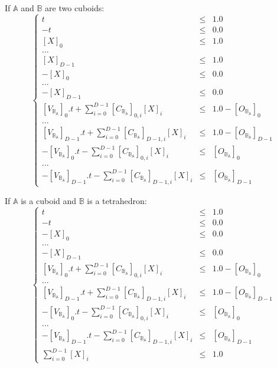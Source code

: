 \documentclass[12pt, a4paper]{article}
\begin{document}
If $\mathbb{A}$ and $\mathbb{B}$ are two cuboids:
\begin{equation}
\left\lbrace
\begin{array}{rcl}
t&\le&1.0\\
-t&\le&0.0\\
\left[X\right]_0&\le&1.0\\
...\\
\left[X\right]_{D-1}&\le&1.0\\
-\left[X\right]_0&\le&0.0\\
...\\
-\left[X\right]_{D-1}&\le&0.0\\
\left[V_{\mathbb{B}_\mathbb{A}}\right]_0.t+\sum_{i=0}^{D-1}\left[C_{\mathbb{B}_\mathbb{A}}\right]_{0,i}\left[X\right]_i&\le&1.0-\left[O_{\mathbb{B}_\mathbb{A}}\right]_0\\
...\\
\left[V_{\mathbb{B}_\mathbb{A}}\right]_{D-1}.t+\sum_{i=0}^{D-1}\left[C_{\mathbb{B}_\mathbb{A}}\right]_{D-1,i}\left[X\right]_i&\le&1.0-\left[O_{\mathbb{B}_\mathbb{A}}\right]_{D-1}\\
-\left[V_{\mathbb{B}_\mathbb{A}}\right]_0.t-\sum_{i=0}^{D-1}\left[C_{\mathbb{B}_\mathbb{A}}\right]_{0,i}\left[X\right]_i&\le&\left[O_{\mathbb{B}_\mathbb{A}}\right]_0\\
...\\
-\left[V_{\mathbb{B}_\mathbb{A}}\right]_{D-1}.t-\sum_{i=0}^{D-1}\left[C_{\mathbb{B}_\mathbb{A}}\right]_{D-1,i}\left[X\right]_i&\le&\left[O_{\mathbb{B}_\mathbb{A}}\right]_{D-1}
\end{array}
\right.
\end{equation}

If $\mathbb{A}$ is a cuboid and $\mathbb{B}$ is a tetrahedron:
\begin{equation}
\left\lbrace
\begin{array}{rcl}
t&\le&1.0\\
-t&\le&0.0\\
-\left[X\right]_0&\le&0.0\\
...\\
-\left[X\right]_{D-1}&\le&0.0\\
\left[V_{\mathbb{B}_\mathbb{A}}\right]_0.t+\sum_{i=0}^{D-1}\left[C_{\mathbb{B}_\mathbb{A}}\right]_{0,i}\left[X\right]_i&\le&1.0-\left[O_{\mathbb{B}_\mathbb{A}}\right]_0\\
...\\
\left[V_{\mathbb{B}_\mathbb{A}}\right]_{D-1}.t+\sum_{i=0}^{D-1}\left[C_{\mathbb{B}_\mathbb{A}}\right]_{D-1,i}\left[X\right]_i&\le&1.0-\left[O_{\mathbb{B}_\mathbb{A}}\right]_{D-1}\\
-\left[V_{\mathbb{B}_\mathbb{A}}\right]_0.t-\sum_{i=0}^{D-1}\left[C_{\mathbb{B}_\mathbb{A}}\right]_{0,i}\left[X\right]_i&\le&\left[O_{\mathbb{B}_\mathbb{A}}\right]_0\\
...\\
-\left[V_{\mathbb{B}_\mathbb{A}}\right]_{D-1}.t-\sum_{i=0}^{D-1}\left[C_{\mathbb{B}_\mathbb{A}}\right]_{D-1,i}\left[X\right]_i&\le&\left[O_{\mathbb{B}_\mathbb{A}}\right]_{D-1}\\
\sum_{i=0}^{D-1}\left[X\right]_i&\le&1.0
\end{array}
\right.
\end{equation}
\end{document}

